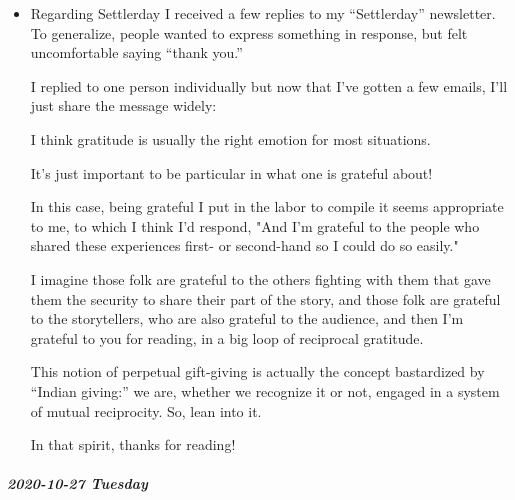 \documentclass[11pt]{article}
\begin{document}
\begin{itemize}
And it is interesting. I agree. But… as an analogy for the massive harms we’ve already let happen to us, when we let our ability to create in the material world get repressed. It is such a valuable story, in that way.

But, on its own, the only repression at hand is our ability to create within kyriarchal society, and if the threat of that repression greatly threatens you: again, breathe. And recognize you’re saying you need the kyriarchy to be creative, and start exploring how you can change that.
\item Regarding Settlerday
\label{sec:orgb72a7b6}
I received a few replies to my “Settlerday” newsletter. To generalize, people wanted to express something in response, but felt uncomfortable saying “thank you.”

I replied to one person individually but now that I’ve gotten a few emails, I’ll just share the message widely:

I think gratitude is usually the right emotion for most situations.

It's just important to be particular in what one is grateful about!

In this case, being grateful I put in the labor to compile it seems appropriate to me, to which I think I'd respond, "And I'm grateful to the people who shared these experiences first- or second-hand so I could do so easily."

I imagine those folk are grateful to the others fighting with them that gave them the security to share their part of the story, and those folk are grateful to the storytellers, who are also grateful to the audience, and then I'm grateful to you for reading, in a big loop of reciprocal gratitude. 

This notion of perpetual gift-giving is actually the concept bastardized by “Indian giving:” we are, whether we recognize it or not, engaged in a system of mutual reciprocity. So, lean into it.

In that spirit, thanks for reading!
\end{itemize}
\subparagraph*{2020-10-27 Tuesday}
\label{sec:org8ad4ea8}
\end{document}
